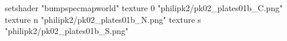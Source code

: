 setshader "bumpspecmapworld"
    texture 0 "philipk2/pk02_plates01b_C.png"
    texture n "philipk2/pk02_plates01b_N.png"
    texture s "philipk2/pk02_plates01b_S.png"
